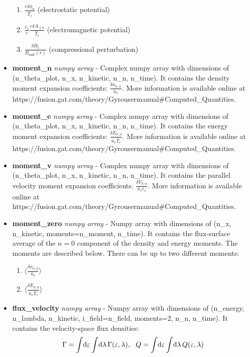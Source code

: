 \documentclass{article}
\begin{document}
\begin{itemize}
\begin{enumerate}
\item $\frac{e\delta\phi_n}{\bar{T}_e}$ (electrostatic potential)
\item $\frac{\bar{c}_s}{c}\frac{e\delta A_{\parallel n}}{\bar{T}_e}$ (electromagnetic potential)
\item $\frac{\delta B_\parallel}{B_{\mathrm{unit}}(r)}$ (compressional perturbation)
\end{enumerate}
\item \textbf{moment\_n}\emph{ numpy array} - Complex numpy array with dimensions of (n\_theta\_plot, n\_x, n\_kinetic, n\_n, n\_time).  It contains the density moment expansion coefficients: $\frac{\delta n_{\sigma,n}}{\bar{n}_e}$.  More information is available online at https://fusion.gat.com/theory/Gyrousermanual\#Computed\_Quantities.
\item \textbf{moment\_e}\emph{ numpy array} - Complex numpy array with dimensions of (n\_theta\_plot, n\_x, n\_kinetic, n\_n, n\_time).  It contains the energy moment expansion coefficients: $\frac{\delta E_{\sigma,n}}{\bar{n}_e\bar{T}_e}$.  More information is available online at https://fusion.gat.com/theory/Gyrousermanual\#Computed\_Quantities.
\item \textbf{moment\_v}\emph{ numpy array} - Complex numpy array with dimensions of (n\_theta\_plot, n\_x, n\_kinetic, n\_n, n\_time).  It contains the parallel velocity moment expansion coefficients: $\frac{\delta V_{\sigma,n}}{\bar{n}_e\bar{c}_s}$.  More information is available online at https://fusion.gat.com/theory/Gyrousermanual\#Computed\_Quantities.
\item \textbf{moment\_zero}\emph{ numpy array} - Numpy array with dimensions of (n\_x, n\_kinetic, moments=n\_moment, n\_time).  It contains the flux-surface average of the $n=0$ component of the density and energy moments.  The moments are described below.  There can be up to two different moments:
\begin{enumerate}
\item $\langle\frac{\delta n_{\sigma,0}}{\bar{n}_e}\rangle$
\item $\langle\frac{\delta E_{\sigma,0}}{\bar{n}_e\bar{T}_e}\rangle$
\end{enumerate}
\item \textbf{flux\_velocity}\emph{ numpy array} - Numpy array with dimensions of (n\_energy, n\_lambda, n\_kinetic, i\_field=n\_field, moments=2, n\_n, n\_time).  It contains the velocity-space flux densities: $$\Gamma=\int \! \dif \varepsilon \int \! \dif \lambda \, \Gamma(\varepsilon, \lambda), \, \, \, \, Q=\int \! \dif \varepsilon \int \! \dif \lambda \, Q(\varepsilon, \lambda)$$

\end{itemize}
\end{document}
